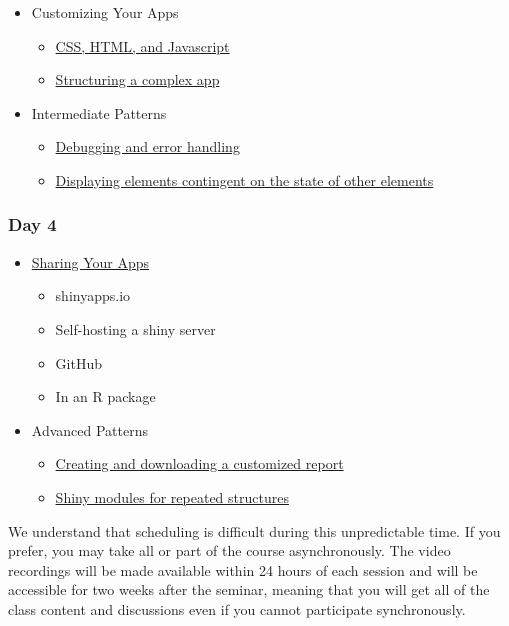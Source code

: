 \documentclass[
]{book}
\providecommand{\tightlist}{%
  \setlength{\itemsep}{0pt}\setlength{\parskip}{0pt}}
\begin{document}
\begin{itemize}
\tightlist
\item
  Customizing Your Apps

  \begin{itemize}
  \tightlist
  \item
    \protect\hyperlink{web}{CSS, HTML, and Javascript}
  \item
    \protect\hyperlink{structure}{Structuring a complex app}
  \end{itemize}
\item
  Intermediate Patterns

  \begin{itemize}
  \tightlist
  \item
    \protect\hyperlink{debugging}{Debugging and error handling}
  \item
    \protect\hyperlink{contingency}{Displaying elements contingent on the state of other elements}
  \end{itemize}
\end{itemize}

\hypertarget{day-4}{%
\subsubsection{Day 4}\label{day-4}}

\begin{itemize}
\tightlist
\item
  \protect\hyperlink{sharing}{Sharing Your Apps}

  \begin{itemize}
  \tightlist
  \item
    shinyapps.io
  \item
    Self-hosting a shiny server
  \item
    GitHub
  \item
    In an R package
  \end{itemize}
\item
  Advanced Patterns

  \begin{itemize}
  \tightlist
  \item
    \protect\hyperlink{reports}{Creating and downloading a customized report}
  \item
    \protect\hyperlink{modules}{Shiny modules for repeated structures}
  \end{itemize}
\end{itemize}

We understand that scheduling is difficult during this unpredictable time. If you prefer, you may take all or part of the course asynchronously. The video recordings will be made available within 24 hours of each session and will be accessible for two weeks after the seminar, meaning that you will get all of the class content and discussions even if you cannot participate synchronously.
\end{document}
